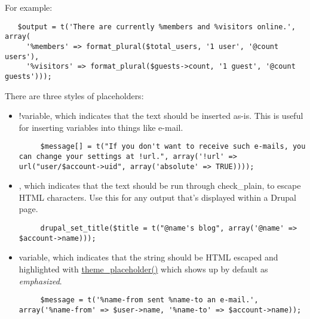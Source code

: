 For example: 

\begin{Code}\begin{verbatim}   $output = t('There are currently %members and %visitors online.', array(
     '%members' => format_plural($total_users, '1 user', '@count users'),
     '%visitors' => format_plural($guests->count, '1 guest', '@count guests')));
\end{verbatim}
\end{Code}



There are three styles of placeholders:\begin{itemize}
\item !variable, which indicates that the text should be inserted as-is. This is useful for inserting variables into things like e-mail. 

\begin{Code}\begin{verbatim}     $message[] = t("If you don't want to receive such e-mails, you can change your settings at !url.", array('!url' => url("user/$account->uid", array('absolute' => TRUE))));
\end{verbatim}
\end{Code}

\end{itemize}


\begin{itemize}
\item , which indicates that the text should be run through check\_\-plain, to escape HTML characters. Use this for any output that's displayed within a Drupal page. 

\begin{Code}\begin{verbatim}     drupal_set_title($title = t("@name's blog", array('@name' => $account->name)));
\end{verbatim}
\end{Code}

\end{itemize}


\begin{itemize}
\item variable, which indicates that the string should be HTML escaped and highlighted with \hyperlink{group__themeable_gc300e87edb69de9245c38a1d09c66adc}{theme\_\-placeholder()} which shows up by default as {\em emphasized\/}. 

\begin{Code}\begin{verbatim}     $message = t('%name-from sent %name-to an e-mail.', array('%name-from' => $user->name, '%name-to' => $account->name));
\end{verbatim}
\end{Code}

\end{itemize}


